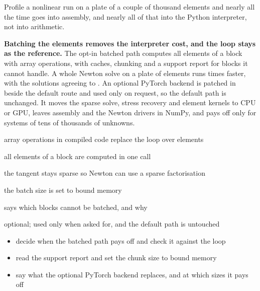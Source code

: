 \newpage\thispagestyle{hl}
\begin{hlquote}Profile a nonlinear run on a plate of a couple of thousand elements and nearly all the time goes into assembly, and nearly all of that into the Python interpreter, not into arithmetic.\end{hlquote}
\vspace{8pt}\begin{hlsum}\textbf{Batching the elements removes the interpreter cost, and the loop stays as the reference.} The opt-in batched path computes all elements of a block with array operations, with caches, chunking and a support report for blocks it cannot handle. A whole Newton solve on a plate of \cbkNewtonNE{} elements runs \cbkNewtonRatio{} times faster, with the solutions agreeing to \cbkNewtonDiff. An optional PyTorch backend is patched in beside the default route and used only on request, so the default path is unchanged. It moves the sparse solve, stress recovery and element kernels to CPU or GPU, leaves assembly and the Newton drivers in NumPy, and pays off only for systems of tens of thousands of unknowns.\end{hlsum}
\begin{description}\setlength\itemsep{5pt}\setlength\parsep{0pt}\renewcommand{\descriptionlabel}[1]{\hspace{\labelsep}\sffamily\bfseries\color{hlnavy}#1}
\item[Vectorisation] array operations in compiled code replace the loop over elements
\item[Batched kernel] all elements of a block are computed in one call
\item[Sparse tangent] the tangent stays sparse so Newton can use a sparse factorisation
\item[Chunking] the batch size is set to bound memory
\item[Support report] says which blocks cannot be batched, and why
\item[PyTorch backend] optional; used only when asked for, and the default path is untouched
\end{description}
\begin{itemize}\setlength\itemsep{3pt}
\item decide when the batched path pays off and check it against the loop
\item read the support report and set the chunk size to bound memory
\item say what the optional PyTorch backend replaces, and at which sizes it pays off
\end{itemize}
